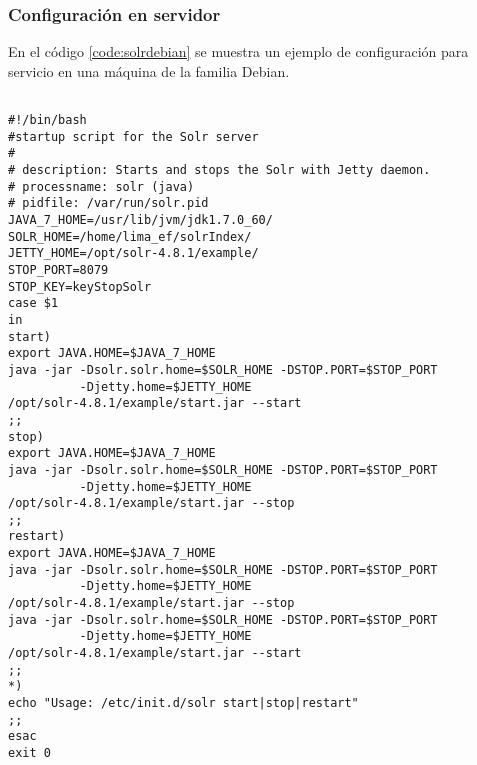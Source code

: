\subsubsection*{Configuración en servidor}
En el código \ref{code:solrdebian} se muestra un ejemplo de configuración para servicio en una máquina de la familia Debian.
\begin{listing}[H]
    \begin{verbatim}

#!/bin/bash
#startup script for the Solr server
#
# description: Starts and stops the Solr with Jetty daemon.
# processname: solr (java)
# pidfile: /var/run/solr.pid
JAVA_7_HOME=/usr/lib/jvm/jdk1.7.0_60/
SOLR_HOME=/home/lima_ef/solrIndex/
JETTY_HOME=/opt/solr-4.8.1/example/
STOP_PORT=8079
STOP_KEY=keyStopSolr
case $1
in
start)
export JAVA.HOME=$JAVA_7_HOME
java -jar -Dsolr.solr.home=$SOLR_HOME -DSTOP.PORT=$STOP_PORT 
          -Djetty.home=$JETTY_HOME
/opt/solr-4.8.1/example/start.jar --start
;;
stop)
export JAVA.HOME=$JAVA_7_HOME
java -jar -Dsolr.solr.home=$SOLR_HOME -DSTOP.PORT=$STOP_PORT 
          -Djetty.home=$JETTY_HOME
/opt/solr-4.8.1/example/start.jar --stop
;;
restart)
export JAVA.HOME=$JAVA_7_HOME
java -jar -Dsolr.solr.home=$SOLR_HOME -DSTOP.PORT=$STOP_PORT 
          -Djetty.home=$JETTY_HOME
/opt/solr-4.8.1/example/start.jar --stop
java -jar -Dsolr.solr.home=$SOLR_HOME -DSTOP.PORT=$STOP_PORT 
          -Djetty.home=$JETTY_HOME
/opt/solr-4.8.1/example/start.jar --start
;;
*)
echo "Usage: /etc/init.d/solr start|stop|restart"
;;
esac
exit 0
    \end{verbatim}
    \caption{Ejemplo de servicio para \gls{solr} en una máquina de Debian (\/etc\/init.de\/solr}
    \label{code:solrdebian}
\end{listing}


